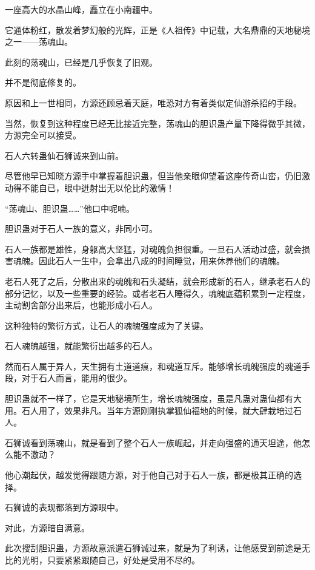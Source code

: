 
\begin{this_body}



一座高大的水晶山峰，矗立在小南疆中。

它通体粉红，散发着梦幻般的光辉，正是《人祖传》中记载，大名鼎鼎的天地秘境之一——荡魂山。

此刻的荡魂山，已经是几乎恢复了旧观。

并不是彻底修复的。

原因和上一世相同，方源还顾忌着天庭，唯恐对方有着类似定仙游杀招的手段。

当然，恢复到这种程度已经无比接近完整，荡魂山的胆识蛊产量下降得微乎其微，方源完全可以接受。

石人六转蛊仙石狮诚来到山前。

尽管他早已知晓方源手中掌握着胆识蛊，但当他亲眼仰望着这座传奇山峦，仍旧激动得不能自已，眼中迸射出无以伦比的激情！

“荡魂山、胆识蛊……”他口中呢喃。

胆识蛊对于石人一族的意义，非同小可。

石人一族都是雄性，身躯高大坚猛，对魂魄负担很重。一旦石人活动过盛，就会损害魂魄。因此石人一生中，会拿出八成的时间睡觉，用来休养他们的魂魄。

老石人死了之后，分散出来的魂魄和石头凝结，就会形成新的石人，继承老石人的部分记忆，以及一些重要的经验。或者老石人睡得久，魂魄底蕴积累到一定程度，主动割舍部分出来后，也能形成小石人。

这种独特的繁衍方式，让石人的魂魄强度成为了关键。

石人魂魄越强，就能繁衍出越多的石人。

然而石人属于异人，天生拥有土道道痕，和魂道互斥。能够增长魂魄强度的魂道手段，对于石人而言，能用的很少。

胆识蛊就不一样了，它是天地秘境所生，增长魂魄强度，虽是凡蛊对蛊仙都有大用。石人用了，效果非凡。当年方源刚刚执掌狐仙福地的时候，就大肆栽培过石人。

石狮诚看到荡魂山，就是看到了整个石人一族崛起，并走向强盛的通天坦途，他怎么能不激动？

他心潮起伏，越发觉得跟随方源，对于他自己对于石人一族，都是极其正确的选择。

石狮诚的表现都落到方源眼中。

对此，方源暗自满意。

此次搜刮胆识蛊，方源故意派遣石狮诚过来，就是为了利诱，让他感受到前途是无比的光明，只要紧紧跟随自己，好处是受用不尽的。


\end{this_body}
